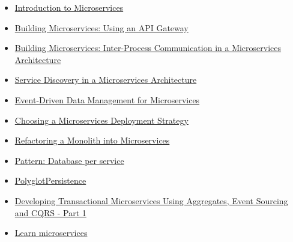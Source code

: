 \documentclass[12pt]{article}
\begin{document}
\begin{itemize}
\tightlist
\item
  \href{https://www.nginx.com/blog/introduction-to-microservices/}{Introduction to Microservices}
\item
  \href{https://www.nginx.com/blog/building-microservices-using-an-api-gateway/}{Building Microservices: Using an API Gateway}
\item
  \href{https://www.nginx.com/blog/building-microservices-inter-process-communication/}{Building Microservices: Inter-Process Communication in a Microservices Architecture}
\item
  \href{https://www.nginx.com/blog/service-discovery-in-a-microservices-architecture/}{Service Discovery in a Microservices Architecture}
\item
  \href{https://www.nginx.com/blog/event-driven-data-management-microservices/}{Event-Driven Data Management for Microservices}
\item
  \href{https://www.nginx.com/blog/deploying-microservices/}{Choosing a Microservices Deployment Strategy}
\item
  \href{https://www.nginx.com/blog/refactoring-a-monolith-into-microservices/}{Refactoring a Monolith into Microservices}
\item
  \href{http://microservices.io/patterns/data/database-per-service.html}{Pattern: Database per service}
\item
  \href{https://martinfowler.com/bliki/PolyglotPersistence.html}{PolyglotPersistence}
\item
  \href{https://www.infoq.com/articles/microservices-aggregates-events-cqrs-part-1-richardson}{Developing Transactional Microservices Using Aggregates, Event Sourcing and CQRS - Part 1}
\item
  \href{http://chrisrichardson.net/learnmicroservices.html}{Learn microservices}
\end{itemize}
\end{document}
